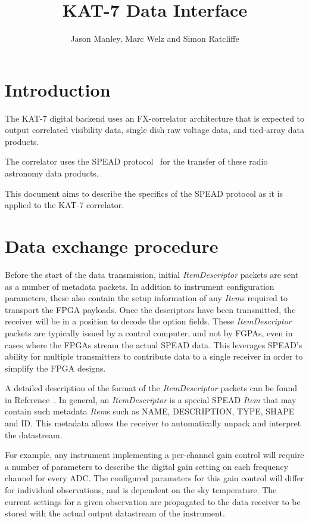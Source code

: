 \documentclass[11pt,english,twoside]{article}
\begin{document}
\title{KAT-7 Data Interface}
\author{Jason Manley, Marc Welz and Simon Ratcliffe}
\makekatdocbeginning



\section{Introduction}

The KAT-7 digital backend uses an FX-correlator architecture that is expected to output correlated visibility data, single dish raw voltage
data, and tied-array data products.

The correlator uses the SPEAD protocol~\cite{speadprotocolska} for the transfer of these radio astronomy data products.

This document aims to describe the specifics of the SPEAD protocol as it is applied to the KAT-7 correlator.


\section{Data exchange procedure}

Before the start of the data transmission, initial \emph{ItemDescriptor} packets are sent as a number of metadata packets. In addition to
instrument configuration parameters, these also contain the setup information of any \emph{Item}s required to transport the FPGA payloads. Once
the descriptors have been transmitted, the receiver will be in a position to decode the option fields. These \emph{ItemDescriptor} packets are
typically issued by a control computer, and not by FGPAs, even in cases where the FPGAs stream the actual SPEAD data. This leverages SPEAD's
ability for multiple transmitters to contribute data to a single receiver in order to simplify the FPGA designs.

A detailed description of the format of the \emph{ItemDescriptor} packets can be found in Reference~\cite{pyspead}. In general, an
\emph{ItemDescriptor} is a special SPEAD \emph{Item} that may contain such metadata \emph{Item}s such as NAME, DESCRIPTION, TYPE, SHAPE and ID.
This metadata allows the receiver to automatically unpack and interpret the datastream.

For example, any instrument implementing a per-channel gain control will require a number of parameters to describe the digital gain setting on
each frequency channel for every ADC. The configured parameters for this gain control will differ for individual observations, and is dependent
on the sky temperature. The current settings for a given observation are propagated to the data receiver to be stored with the actual output
datastream of the instrument.
\end{document}
